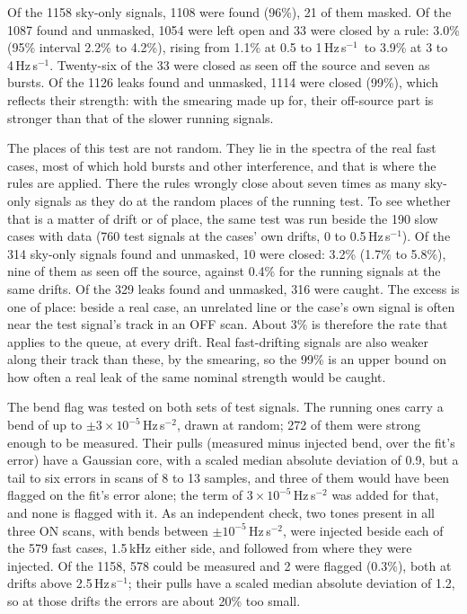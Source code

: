 \documentclass[twocolumn]{aastex631}
\newcommand{\hzs}{Hz\,s$^{-1}$}
\begin{document}
Of the 1158 sky-only signals, 1108 were found (96\%), 21 of them masked. Of
the 1087 found and unmasked, 1054 were left open and 33 were closed by a
rule: 3.0\% (95\% interval 2.2\% to 4.2\%), rising from 1.1\% at 0.5 to
1\,\hzs\ to 3.9\% at 3 to 4\,\hzs. Twenty-six of the 33 were closed as
seen off the source and seven as bursts. Of the 1126 leaks found and
unmasked, 1114 were closed (99\%), which reflects their strength: with the
smearing made up for, their off-source part is stronger than that of the
slower running signals.

The places of this test are not random. They lie in the spectra of the
real fast cases, most of which hold bursts and other interference, and that
is where the rules are applied. There the rules wrongly close about seven
times as many sky-only signals as they do at the random places of the
running test. To see whether that is a matter of drift or of place, the
same test was run beside the 190 slow cases with data (760 test signals at
the cases' own drifts, 0 to 0.5\,\hzs). Of the 314 sky-only signals found
and unmasked, 10 were closed: 3.2\% (1.7\% to 5.8\%), nine of them as seen
off the source, against 0.4\% for the running signals at the same drifts.
Of the 329 leaks found and unmasked, 316 were caught. The excess is one of
place: beside a real case, an unrelated line or the case's own signal is
often near the test signal's track in an OFF scan. About 3\% is therefore
the rate that applies to the queue, at every drift. Real fast-drifting signals are also weaker along their track
than these, by the smearing, so the 99\% is an upper bound on how often a
real leak of the same nominal strength would be caught.

The bend flag was tested on both sets of test signals. The running ones
carry a bend of up to $\pm3\times10^{-5}$\,Hz\,s$^{-2}$, drawn at random; 272
of them were strong enough to be measured. Their pulls (measured minus
injected bend, over the fit's error) have a Gaussian core, with a scaled
median absolute deviation of 0.9, but a tail to six errors in scans of 8 to
13 samples, and three of them would have been flagged on the fit's error
alone; the term of $3\times10^{-5}$\,Hz\,s$^{-2}$ was added for that, and
none is flagged with it. As an independent check, two tones present in all
three ON scans, with bends between $\pm10^{-5}$\,Hz\,s$^{-2}$, were injected
beside each of the 579 fast cases, 1.5\,kHz either side, and followed from
where they were injected. Of the 1158, 578 could be measured and 2 were
flagged (0.3\%), both at drifts above 2.5\,\hzs; their pulls have a scaled
median absolute deviation of 1.2, so at those drifts the errors are about
20\% too small.
\end{document}
